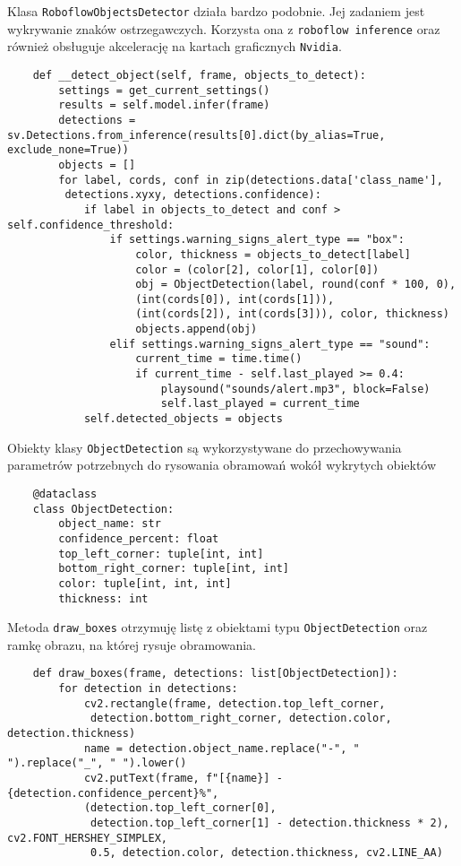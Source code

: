 Klasa \verb|RoboflowObjectsDetector| działa bardzo podobnie. Jej zadaniem jest wykrywanie znaków ostrzegawczych. Korzysta ona z \verb|roboflow inference| oraz również obsługuje akcelerację na kartach graficznych \verb|Nvidia|.

\begin{verbatim}
	def __detect_object(self, frame, objects_to_detect):
		settings = get_current_settings()
		results = self.model.infer(frame)
		detections = sv.Detections.from_inference(results[0].dict(by_alias=True, exclude_none=True))
		objects = []
		for label, cords, conf in zip(detections.data['class_name'],
		 detections.xyxy, detections.confidence):
			if label in objects_to_detect and conf > self.confidence_threshold:
				if settings.warning_signs_alert_type == "box":
					color, thickness = objects_to_detect[label]
					color = (color[2], color[1], color[0])
					obj = ObjectDetection(label, round(conf * 100, 0), 
					(int(cords[0]), int(cords[1])),
					(int(cords[2]), int(cords[3])), color, thickness)
					objects.append(obj)
				elif settings.warning_signs_alert_type == "sound":
					current_time = time.time()
					if current_time - self.last_played >= 0.4:
						playsound("sounds/alert.mp3", block=False)
						self.last_played = current_time
			self.detected_objects = objects
\end{verbatim}

\newpage

Obiekty klasy \verb|ObjectDetection| są wykorzystywane do przechowywania parametrów potrzebnych do rysowania obramowań wokół wykrytych obiektów


\begin{verbatim}
	@dataclass
	class ObjectDetection:
		object_name: str
		confidence_percent: float
		top_left_corner: tuple[int, int]
		bottom_right_corner: tuple[int, int]
		color: tuple[int, int, int]
		thickness: int
\end{verbatim}

Metoda \verb|draw_boxes| otrzymuję listę z obiektami typu \verb|ObjectDetection| oraz ramkę obrazu, na której rysuje obramowania.

\begin{verbatim}
	def draw_boxes(frame, detections: list[ObjectDetection]):
		for detection in detections:
			cv2.rectangle(frame, detection.top_left_corner,
			 detection.bottom_right_corner, detection.color, detection.thickness)
			name = detection.object_name.replace("-", " ").replace("_", " ").lower()
			cv2.putText(frame, f"[{name}] - {detection.confidence_percent}%",
			(detection.top_left_corner[0],
			 detection.top_left_corner[1] - detection.thickness * 2), cv2.FONT_HERSHEY_SIMPLEX, 
			 0.5, detection.color, detection.thickness, cv2.LINE_AA)
\end{verbatim}

